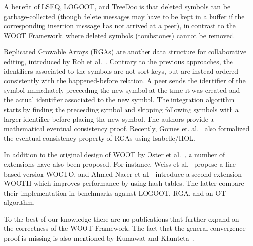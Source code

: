 \documentclass[11pt,a4paper]{article}
\begin{document}
A benefit of LSEQ, LOGOOT, and TreeDoc is that deleted symbols can be garbage-collected (though delete messages may have to be kept in a buffer if the corresponding insertion message has not arrived at a peer), in contrast to the WOOT Framework, where deleted symbols (tombstones) cannot be removed.

Replicated Growable Arrays (RGAs) are another data structure for collaborative editing, introduced by Roh et al.~\cite{roh2009optimistic}.
Contrary to the previous approaches, the identifiers associated to the symbols are not sort keys, but are instead ordered consistently with the happened-before relation.
A peer sends the identifier of the symbol immediately preceeding the new symbol at the time it was created and the actual identifier associated to the new symbol.
The integration algorithm starts by finding the preceeding symbol and skipping following symbols with a larger identifier before placing the new symbol.
The authors provide a mathematical eventual consistency proof. Recently, Gomes et. al.~\cite{gomes2017verifying} also formalized the eventual consistency property of RGAs using Isabelle/HOL.

In addition to the original design of WOOT by Oster et al.~\cite{oster2006data}, a number of extensions have also been proposed.
For instance, Weiss et al.~\cite{weiss2007wooki} propose a line-based version WOOTO, and Ahmed-Nacer et al.~\cite{nacer2011} introduce a second extension WOOTH which improves performance by using hash tables.
The latter compare their implementation in benchmarks against LOGOOT, RGA, and an OT algorithm.

To the best of our knowledge there are no publications that further expand on the correctness of the WOOT Framework.
The fact that the general convergence proof is missing is also mentioned by Kumawat and Khun\-teta~\cite[Section 3.10]{kumawat2010survey}.





\end{document}
